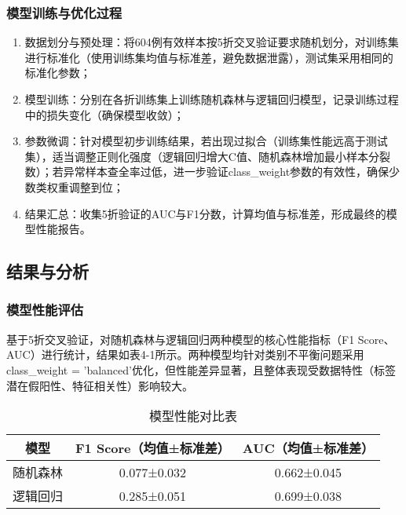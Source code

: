 \documentclass[withoutpreface,bwprint]{cumcmthesis} %
\begin{document}
\subsubsection{模型训练与优化过程}
\begin{enumerate}
    \item 数据划分与预处理：将604例有效样本按5折交叉验证要求随机划分，对训练集进行标准化（使用训练集均值与标准差，避免数据泄露），测试集采用相同的标准化参数；  
    \item 模型训练：分别在各折训练集上训练随机森林与逻辑回归模型，记录训练过程中的损失变化（确保模型收敛）；
    \item 参数微调：针对模型初步训练结果，若出现过拟合（训练集性能远高于测试集），适当调整正则化强度（逻辑回归增大C值、随机森林增加最小样本分裂数）；若异常样本查全率过低，进一步验证class\_weight参数的有效性，确保少数类权重调整到位；
    \item 结果汇总：收集5折验证的AUC与F1分数，计算均值与标准差，形成最终的模型性能报告。
\end{enumerate}

\subsection{结果与分析}
\subsubsection{模型性能评估}
基于5折交叉验证，对随机森林与逻辑回归两种模型的核心性能指标（F1 Score、AUC）进行统计，结果如表4-1所示。两种模型均针对类别不平衡问题采用class\_weight = 'balanced'优化，但性能差异显著，且整体表现受数据特性（标签潜在假阳性、特征相关性）影响较大。


\begin{table}[H]
    \centering  %
    \caption{模型性能对比表}  %
    \label{tab:模型性能对比表}  %
    \begin{threeparttable}
        \begin{tabularx}{0.75\textwidth}{c c c}
            \toprule[1.5pt]
            \textbf{模型} & \textbf{F1 Score（均值±标准差）} & \textbf{AUC（均值±标准差）} \\ 
            \midrule[1pt]
            随机森林 & 0.077±0.032 & 0.662±0.045 \\
            逻辑回归 & 0.285±0.051 & 0.699±0.038 \\

            \bottomrule[1.5pt]
        
        \end{tabularx}
    \end{threeparttable}
\end{table}
\end{document}
